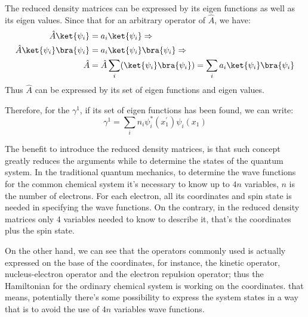 The reduced density matrices can be expressed by its eigen functions
as well as its eigen values. Since that for an arbitrary operator of
$\hat{A}$, we have:
\begin{align}\label{}
  \hat{A}\ket{\psi_{i}} &= a_{i}\ket{\psi_{i}} \Rightarrow \nonumber \\
  \hat{A}\ket{\psi_{i}}\bra{\psi_{i}} &=
  a_{i}\ket{\psi_{i}}\bra{\psi_{i}}
  \Rightarrow \nonumber \\
  \hat{A} &= \hat{A}\sum_{i}(\ket{\psi_{i}}\bra{\psi_{i}}) =
  \sum_{i}a_{i}\ket{\psi_{i}}\bra{\psi_{i}}
\end{align}
Thus $\hat{A}$ can be expressed by its set of eigen functions and
eigen values.

Therefore, for the $\gamma^{1}$, if its set of eigen functions has
been found, we can write:
\begin{equation}\label{}
  \gamma^{1} = \sum_{i}n_{i}\psi^{*}_{i}(x^{'}_{1})\psi_{i}(x_{1})
\end{equation}


The benefit to introduce the reduced density matrices, is that such
concept greatly reduces the arguments while to determine the states
of the quantum system. In the traditional quantum mechanics, to
determine the wave functions for the common chemical system it's
necessary to know up to $4n$ variables, $n$ is the number of
electrons. For each electron, all its coordinates and spin state is
needed in specifying the wave functions. On the contrary, in the
reduced density matrices only $4$ variables needed to know to
describe it, that's the coordinates plus the spin state.

On the other hand, we can see that the operators commonly used is
actually expressed on the base of the coordinates, for instance, the
kinetic operator, nucleus-electron operator and the electron
repulsion operator; thus the Hamiltonian for the ordinary chemical
system is working on the coordinates. that means, potentially
there's some possibility to express the system states in a way that
is to avoid the use of $4n$ variables wave functions.



